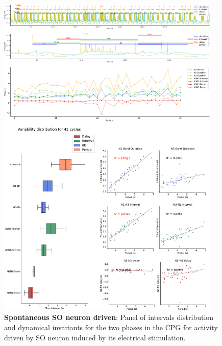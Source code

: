 \begin{figure}[htbp]
	\centering
	\includegraphics[width=0.95\textwidth]{./invariants/data/SUSSEX/SO_driven/images/panel_with_intervals.pdf}
	\caption{\textbf{Spontaneous SO neuron driven}: Panel of intervals distribution and dynamical invariants for the two phases in the CPG for activity driven by SO neuron induced by its electrical stimulation.}
	\label{fig:so induced invariants}
\end{figure}

